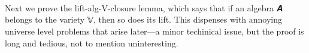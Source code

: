 \begin{code}
\\
%
\>[1]\<%
\\
%
\\[\AgdaEmptyExtraSkip]%
%
\\[\AgdaEmptyExtraSkip]%
%
\>[1]\<%
\\
%
\>[1]\AgdaSpace{}%
\AgdaSpace{}%
\AgdaSpace{}%
\AgdaSymbol{:}\AgdaSpace{}%
\<%
\\
%
\>[1]\AgdaSpace{}%
\AgdaSymbol{=}\AgdaSpace{}%
\AgdaSpace{}%
\AgdaSpace{}%
\AgdaSpace{}%
\AgdaSpace{}%
\AgdaSpace{}%
\<%
\\
%
\>[1]\AgdaSpace{}%
\AgdaSymbol{=}\AgdaSpace{}%
\AgdaSpace{}%
\<%
\\
%
\>[1]\AgdaSpace{}%
\AgdaSymbol{=}\AgdaSpace{}%
\AgdaSpace{}%
\AgdaSpace{}%
\<%
\end{code}

Next we prove the lift-alg-V-closure lemma, which says that if an
algebra 𝑨 belongs to the variety 𝕍, then so does its lift. This
dispenses with annoying universe level problems that arise later---a
minor techinical issue, but the proof is long and tedious, not to
mention uninteresting.

